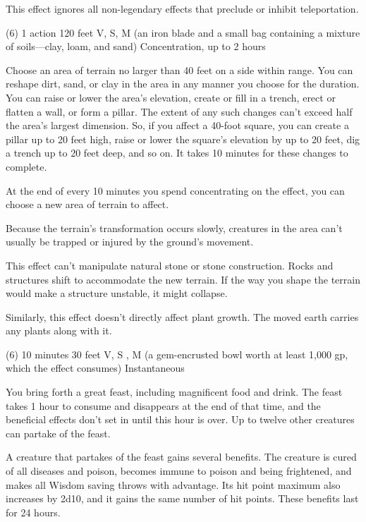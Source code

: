 This effect ignores all non-legendary effects that preclude or inhibit teleportation.



{(6)}
{1 action}
{120 feet}
{V, S, M (an iron blade and a small bag containing a mixture of soils—clay, loam, and sand)}
{Concentration, up to 2 hours}

Choose an area of terrain no larger than 40 feet on a side within range. You can reshape dirt, sand, or clay in the area in any manner you choose for the duration. You can raise or lower the area's elevation, create or fill in a trench, erect or flatten a wall, or form a pillar. The extent of any such changes can't exceed half the area's largest dimension. So, if you affect a 40-foot square, you can create a pillar up to 20 feet high, raise or lower the square's elevation by up to 20 feet, dig a trench up to 20 feet deep, and so on. It takes 10 minutes for these changes to complete.

At the end of every 10 minutes you spend concentrating on the effect, you can choose a new area of terrain to affect.

Because the terrain's transformation occurs slowly, creatures in the area can't usually be trapped or injured by the ground's movement.

This effect can't manipulate natural stone or stone construction. Rocks and structures shift to accommodate the new terrain. If the way you shape the terrain would make a structure unstable, it might collapse.

Similarly, this effect doesn't directly affect plant growth. The moved earth carries any plants along with it.

\label{spell:heroes-feast}
{(6)}
{10 minutes}
{30 feet}
{V, S , M (a gem-encrusted bowl worth at least 1,000 gp, which the effect consumes)}
{Instantaneous}

You bring forth a great feast, including magnificent food and drink. The feast takes 1 hour to consume and disappears at the end of that time, and the beneficial effects don't set in until this hour is over. Up to twelve other creatures can partake of the feast.

A creature that partakes of the feast gains several benefits. The creature is cured of all diseases and poison, becomes immune to poison and being frightened, and makes all Wisdom saving throws with advantage. Its hit point maximum also increases by 2d10, and it gains the same number of hit points. These benefits last for 24 hours.

